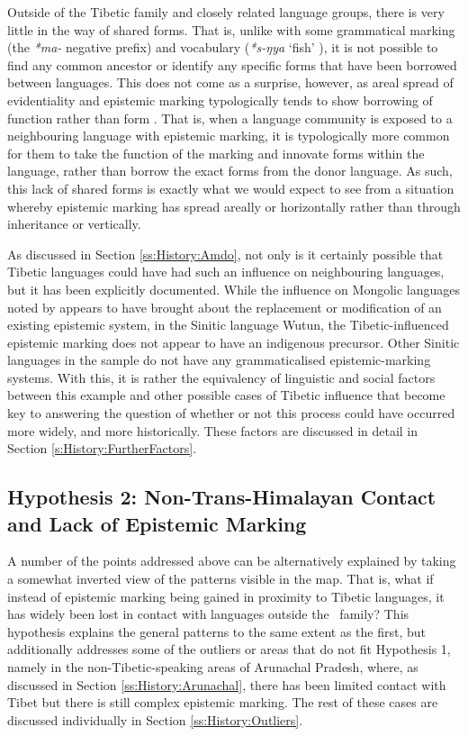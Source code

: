 Outside of the Tibetic family and closely related language groups, there is very little in the way of shared forms. That is, unlike with some grammatical marking (the \textit{*ma-} negative prefix) and vocabulary (\textit{*s-ŋya} `fish' \cite{STEDT}), it is not possible to find any common ancestor or identify any specific forms that have been borrowed between languages. This does not come as a surprise, however, as areal spread of evidentiality and epistemic marking typologically tends to show borrowing of function rather than form \cite{Aikhenvald2004}. That is, when a language community is exposed to a neighbouring language with epistemic marking, it is typologically more common for them to take the function of the marking and innovate forms within the language, rather than borrow the exact forms from the donor language. As such, this lack of shared forms is exactly what we would expect to see from a situation whereby epistemic marking has spread areally or horizontally rather than through inheritance or vertically.

As discussed in Section \ref{ss:History:Amdo}, not only is it certainly possible that Tibetic languages could have had such an influence on neighbouring languages, but it has been explicitly documented. While the influence on Mongolic languages noted by  appears to have brought about the replacement or modification of an existing epistemic system, in the Sinitic language Wutun, the Tibetic-influenced epistemic marking does not appear to have an indigenous precursor. Other Sinitic languages in the sample do not have any grammaticalised epistemic-marking systems. With this, it is rather the equivalency of linguistic and social factors between this example and other possible cases of Tibetic influence that become key to answering the question of whether or not this process could have occurred more widely, and more historically. These factors are discussed in detail in Section \ref{s:History:FurtherFactors}.

\subsection{Hypothesis 2: Non-Trans-Himalayan Contact and Lack of Epistemic Marking}
A number of the points addressed above can be alternatively explained by taking a somewhat inverted view of the patterns visible in the map. That is, what if instead of epistemic marking being gained in proximity to Tibetic languages, it has widely been lost in contact with languages outside the \lfam\ family? This hypothesis explains the general patterns to the same extent as the first, but additionally addresses some of the outliers or areas that do not fit Hypothesis 1, namely in the non-Tibetic-speaking areas of Arunachal Pradesh, where, as discussed in Section \ref{ss:History:Arunachal}, there has been limited contact with Tibet but there is still complex epistemic marking. The rest of these cases are discussed individually in Section \ref{ss:History:Outliers}.

